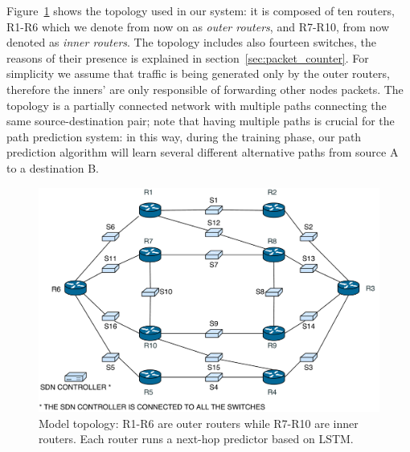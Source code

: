 Figure~\ref{fig:topology} shows the topology used in our system: it is composed of ten routers, R1-R6 which we denote from now on as \textit{outer routers}, and R7-R10, from now denoted as \textit{inner routers}. The topology includes also fourteen switches, the reasons of their presence is explained in section~\ref{sec:packet_counter}. For simplicity we assume that traffic is being generated only by the outer routers, therefore the inners' are only responsible of forwarding other nodes packets. The topology is a partially connected network with multiple paths connecting the same source-destination pair; note that having multiple paths is crucial for the path prediction system: in this way, during the training phase, our path prediction algorithm will learn several different alternative paths from source A to a destination B.

\begin{figure}[h]
\centering
\includegraphics[width=\textwidth, keepaspectratio]{img/network_arch}
\caption{Model topology: R1-R6 are outer routers while R7-R10 are inner routers. Each router runs a next-hop predictor based on LSTM.} 
\label{fig:topology}
\end{figure}


